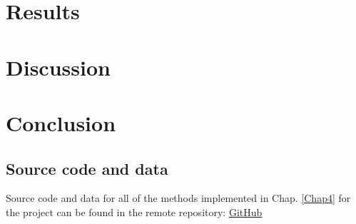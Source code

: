 \documentclass[12pt, a4paper]{report}
\begin{document}
\chapter{Results} \label{Chap5}
\chapter{Discussion} \label{Chap6}
\chapter{Conclusion} \label{Chap7}


\renewcommand{\bibname}{References}

%

\begin{appendices}
\chapter{Source code and data} \label{System Requirements}
Source code and data for all of the methods implemented in Chap. \ref{Chap4} for the project can be found in the remote repository: \href{https://github.com/rpoandres/MSc_USS_Dissertation}{GitHub}






\end{appendices}
\clearpage
\printglossaries

\end{document}
